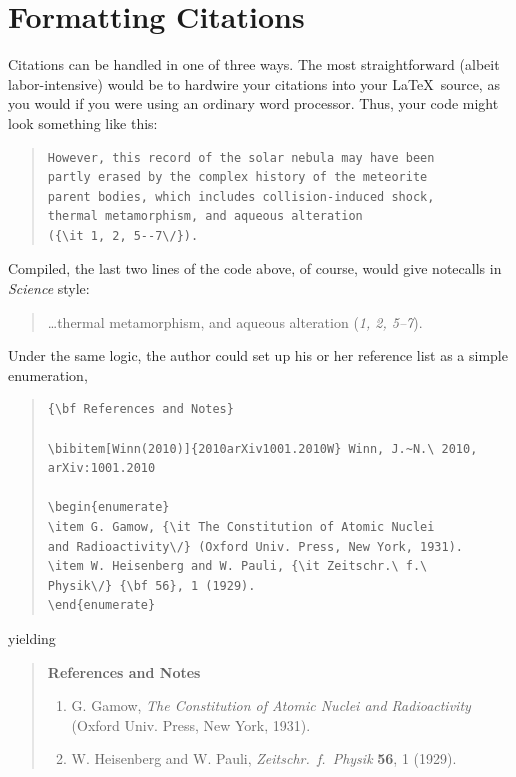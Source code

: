 \documentclass[12pt]{article}
\begin{document}
\section*{Formatting Citations}

Citations can be handled in one of three ways.  The most
straightforward (albeit labor-intensive) would be to hardwire your
citations into your \LaTeX\ source, as you would if you were using an
ordinary word processor.  Thus, your code might look something like
this:


\begin{quote}
\begin{verbatim}
However, this record of the solar nebula may have been
partly erased by the complex history of the meteorite
parent bodies, which includes collision-induced shock,
thermal metamorphism, and aqueous alteration
({\it 1, 2, 5--7\/}).
\end{verbatim}
\end{quote}


\noindent Compiled, the last two lines of the code above, of course, would give notecalls in {\it Science\/} style:

\begin{quote}
\ldots thermal metamorphism, and aqueous alteration ({\it 1, 2, 5--7\/}).
\end{quote}

Under the same logic, the author could set up his or her reference list as a simple enumeration,

\begin{quote}
\begin{verbatim}
{\bf References and Notes}

\bibitem[Winn(2010)]{2010arXiv1001.2010W} Winn, J.~N.\ 2010, 
arXiv:1001.2010 

\begin{enumerate}
\item G. Gamow, {\it The Constitution of Atomic Nuclei
and Radioactivity\/} (Oxford Univ. Press, New York, 1931).
\item W. Heisenberg and W. Pauli, {\it Zeitschr.\ f.\ 
Physik\/} {\bf 56}, 1 (1929).
\end{enumerate}
\end{verbatim}
\end{quote}

\noindent yielding

\begin{quote}
{\bf References and Notes}

\begin{enumerate}
\item G. Gamow, {\it The Constitution of Atomic Nuclei and
Radioactivity\/} (Oxford Univ. Press, New York, 1931).
\item W. Heisenberg and W. Pauli, {\it Zeitschr.\ f.\ Physik} {\bf 56},
1 (1929).
\end{enumerate}
\end{quote}
\end{document}
